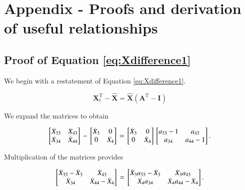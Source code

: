 \documentclass[authoryear,preprint,review,12pt]{elsarticle}
\let\oldhat\hat
\renewcommand{\vec}[1]{\mathbf{#1}}
\renewcommand{\hat}[1]{\oldhat{\mathbf{#1}}}
\begin{document}
\section{Appendix - Proofs and derivation of useful relationships}

\subsection{Proof of Equation \ref{eq:Xdifference1}}

We begin with a restatement of Equation \ref{eq:Xdifference1}.

\begin{equation} \label{eq:Xdifference1Proof-1}
	\vec{X}_t^\mathrm{T} - \hat{\vec{X}} = \hat{\vec{X}}(\vec{A}^\mathrm{T} - \vec{I})
\end{equation}

\noindent We expand the matrices to obtain

\begin{equation} \label{eq:Xdifference1Proof-2}
\begin{bmatrix} 	\dot{X}_{33} & \dot{X}_{43}	\\
				\dot{X}_{34} & \dot{X}_{44}	\\
\end{bmatrix} \\
- \\
\begin{bmatrix} 	\dot{X}_{3} & 0	\\
				0 & \dot{X}_{4}	\\
\end{bmatrix} \\
= \\
\begin{bmatrix} 	\dot{X}_{3} & 0	\\
				0 & \dot{X}_{4}	\\
\end{bmatrix} \\
\begin{bmatrix} 	a_{33}-1 & a_{43}	\\
				a_{34} & a_{44}-1	\\
\end{bmatrix}.
\end{equation}

\noindent Multiplication of the matrices provides

\begin{equation} \label{eq:Xdifference1Proof-3}
\begin{bmatrix} 	\dot{X}_{33} - \dot{X}_3 & \dot{X}_{43}	\\
				\dot{X}_{34} & \dot{X}_{44} - \dot{X}_4	\\
\end{bmatrix} \\
= \\
\begin{bmatrix} 	\dot{X}_3 a_{33} - \dot{X}_3 & \dot{X}_3 a_{43}	\\
				\dot{X}_4 a_{34} & \dot{X}_4 a_{44} - \dot{X}_4	\\
\end{bmatrix}.
\end{equation}
\end{document}
